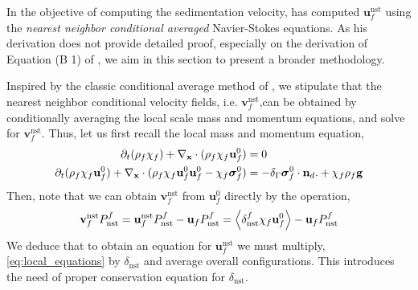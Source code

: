 In the objective of computing the sedimentation velocity, \citet[Appendix B]{zhang2021ensemble} has computed $\textbf{u}_f^\text{nst}$ using the \textit{nearest neighbor conditional averaged} Navier-Stokes equations. 
As his derivation does not provide detailed proof, especially on the derivation of Equation (B 1) of \citet{zhang2021ensemble},  we aim in this section to present a broader methodology. 

Inspired by the classic conditional average method of \citet{hinch1977averaged}, we stipulate that the nearest neighbor conditional velocity fields, i.e. $\textbf{v}_f^\text{nst}$,can be obtained by conditionally averaging the local scale mass and momentum equations, and solve for $\textbf{v}_f^\text{nst}$. 
Thus, let us first recall the local mass and momentum equation, 
\begin{align}
    \pddt (\rho_f\chi_f) +  \pddx \cdot (\rho_f\chi_f\textbf{u}^0_f) &= 0 \\
    \pddt (\rho_f\chi_f\textbf{u}^0_f)
    + \pddx\cdot (\rho_f\chi_f\textbf{u}^0_f\textbf{u}^0_f - \chi_f\bm\sigma^0_f)
    &= 
    - \delta_\Gamma \bm\sigma_f^0 \cdot \textbf{n}_d. 
    + \chi_f \rho_f \textbf{g}
    \label{eq:local_equations}
\end{align}
Then, note that we can obtain $\textbf{v}_f^\text{nst}$ from $\textbf{u}_f^0$ directly by the operation, 
\begin{equation*}
    \textbf{v}_f^\text{nst} P_\text{nst}^f
    = 
    \textbf{u}_f^\text{nst} P_\text{nst}^f
    - \textbf{u}_f P_\text{nst}^f
    = 
    \left<\delta_\text{nst}^f \chi_f \textbf{u}_f^0\right>
    - \textbf{u}_f P_\text{nst}^f
\end{equation*}
We deduce that to obtain an equation for $\textbf{u}_f^\text{nst}$ we must multiply, \ref{eq:local_equations} by $\delta_\text{nst}$ and average overall configurations. 
This introduces the need of proper conservation equation for $\delta_\text{nst}$. 

